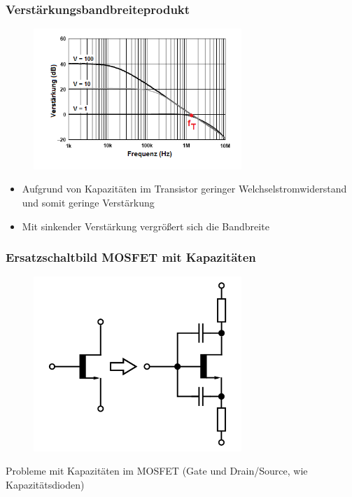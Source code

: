 \begin{frame}
  \frametitle{Verstärkungsbandbreiteprodukt}
  \begin{center}
    \begin{figure}
      \includegraphics[width=0.7\textwidth,height=.5\textheight,keepaspectratio]{a07/Closed_loop_gain.png}
    \end{figure}
    \begin{itemize}
      \item Aufgrund von Kapazitäten im Transistor geringer Welchselstromwiderstand und somit geringe Verstärkung
      \item Mit sinkender Verstärkung vergrößert sich die Bandbreite
    \end{itemize}
  \end{center}
\end{frame}

\begin{frame}
  \frametitle{Ersatzschaltbild MOSFET mit Kapazitäten}
  \begin{center}
    \begin{figure}
      \includegraphics[width=0.7\textwidth,height=.6\textheight,keepaspectratio]{a07/HF_Ersatzschaltbild.png}
    \end{figure}
    Probleme mit Kapazitäten im MOSFET (Gate und Drain/Source, wie Kapazitätsdioden)
  \end{center}
\end{frame}

